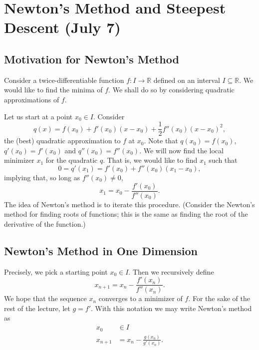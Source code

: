 \documentclass[11pt]{article}
\newcommand{\R}{\mathbb{R}}
\begin{document}
\section{Newton's Method and Steepest Descent (July 7)}

\subsection{Motivation for Newton's Method}

Consider a twice-differentiable function $f : I \to \R$ defined on an interval $I \subseteq \R$. We would like to find the minima of $f$. We shall do so by considering quadratic approximations of $f$. 

Let us start at a point $x_0 \in I$. Consider 
\[
q(x) = f(x_0) + f'(x_0)(x - x_0) + \frac{1}{2}f''(x_0)(x-x_0)^2,
\]
the (best) quadratic approximation to $f$ at $x_0$. Note that $q(x_0) = f(x_0)$, $q'(x_0) = f'(x_0)$ and $q''(x_0) = f''(x_0)$. We will now find the local minimizer $x_1$ for the quadratic $q$. That is, we would like to find $x_1$ such that
\[
0 = q'(x_1) = f'(x_0) + f''(x_0)(x_1-x_0),
\]
implying that, so long as $f''(x_0) \neq 0$, 
\[
x_1 = x_0 - \frac{f'(x_0)}{f''(x_0)}.
\]
The idea of Newton's method is to iterate this procedure. (Consider the Newton's method for finding roots of functions; this is the same as finding the root of the derivative of the function.)

\subsection{Newton's Method in One Dimension}

Precisely, we pick a starting point $x_0 \in I$. Then we recursively define
\[
x_{n+1} = x_n - \frac{f'(x_n)}{f''(x_n)}.
\]
We hope that the sequence $x_n$ converges to a minimizer of $f$. For the sake of the rest of the lecture, let $g = f'$. With this notation we may write Newton's method as
\begin{align*}
x_0 &\in I \\
x_{n+1} &= x_n - \frac{g(x_n)}{g'(x_n)}.
\end{align*}
\end{document}
